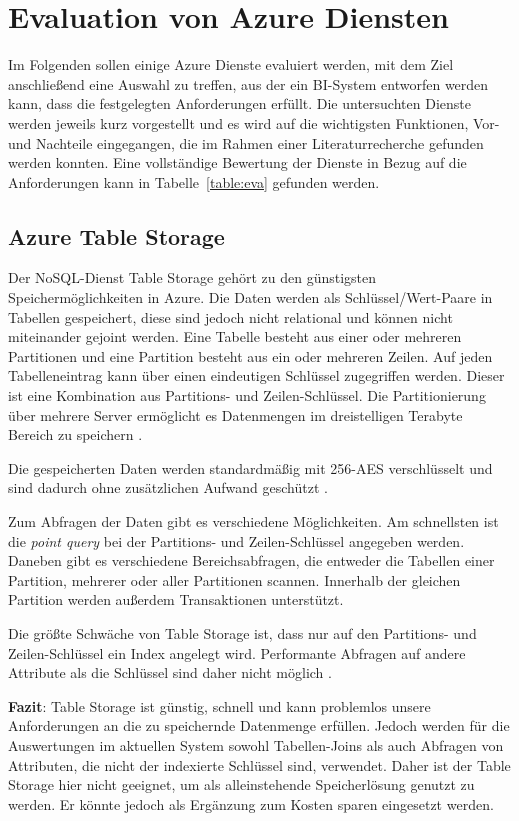 \section{Evaluation von Azure Diensten} \label{sec:evaluation}
Im Folgenden sollen einige Azure Dienste evaluiert werden, mit dem Ziel anschließend eine Auswahl zu treffen, aus der ein BI-System entworfen werden kann, dass die festgelegten Anforderungen erfüllt. Die untersuchten Dienste werden jeweils kurz vorgestellt und es wird auf die wichtigsten Funktionen, Vor- und Nachteile eingegangen, die im Rahmen einer Literaturrecherche gefunden werden konnten. Eine vollständige Bewertung der Dienste in Bezug auf die Anforderungen kann in Tabelle~\ref{table:eva} gefunden werden.

\subsection{Azure Table Storage} \label{sec:grundlagen:azure_dienste:tableStorage}
Der NoSQL-Dienst Table Storage gehört zu den günstigsten Speichermöglichkeiten in Azure. Die Daten werden als Schlüssel/Wert-Paare in Tabellen gespeichert, diese sind jedoch nicht relational und können nicht miteinander gejoint werden. Eine Tabelle besteht aus einer oder mehreren Partitionen und eine Partition besteht aus ein oder mehreren Zeilen. Auf jeden Tabelleneintrag kann über einen eindeutigen Schlüssel zugegriffen werden. Dieser ist eine Kombination aus Partitions- und Zeilen-Schlüssel. Die Partitionierung über mehrere Server ermöglicht es Datenmengen im dreistelligen Terabyte Bereich zu speichern \cite{reagan_web_2018}.

Die gespeicherten Daten werden standardmäßig mit 256-AES verschlüsselt und sind dadurch ohne zusätzlichen Aufwand geschützt \cite{soh_microsoft_2020}. 

Zum Abfragen der Daten gibt es verschiedene Möglichkeiten. Am schnellsten ist die \textit{point query} bei der Partitions- und Zeilen-Schlüssel angegeben werden. Daneben gibt es verschiedene Bereichsabfragen, die entweder die Tabellen einer Partition, mehrerer oder aller Partitionen scannen. Innerhalb der gleichen Partition werden außerdem Transaktionen unterstützt. 

Die größte Schwäche von Table Storage ist, dass nur auf den Partitions- und Zeilen-Schlüssel ein Index angelegt wird. Performante Abfragen auf andere Attribute als die Schlüssel sind daher nicht möglich \cite{reagan_web_2018}.

\textbf{Fazit}: Table Storage ist günstig, schnell und kann problemlos unsere Anforderungen an die zu speichernde Datenmenge erfüllen. Jedoch werden für die Auswertungen im aktuellen System sowohl Tabellen-Joins als auch Abfragen von Attributen, die nicht der indexierte Schlüssel sind, verwendet. Daher ist der Table Storage hier nicht geeignet, um als alleinstehende Speicherlösung genutzt zu werden. Er könnte jedoch als Ergänzung zum Kosten sparen eingesetzt werden. \cite[vgl.][]{reagan_web_2018}

